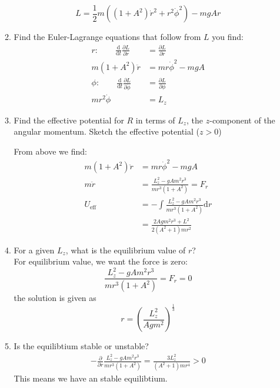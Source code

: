 \documentclass{article}
\newcommand{\de}{\mathrm{d}}
\begin{document}
\begin{enumerate}
\begin{enumerate}
        \[
            L = \frac{1}{2}m((1+A^2)\dot r^2 + r^2 \dot \phi^2) - mgAr
        \]
        \item Find the Euler-Lagrange equations that follow from $L$ you find:
        \begin{align*}
            r: \qquad \frac{\de}{\de t}\frac{\partial L}{\partial \dot r} &= \frac{\partial L}{\partial r}\\
                          m(1+A^2)\ddot r &= mr\dot \phi^2 - mgA \\
                \phi: \qquad \frac{\de}{\de t}\frac{\partial L}{\partial \dot \phi} &= \frac{\partial L}{\partial \phi}\\
                mr^2\dot \phi &= L_z
        \end{align*}
        \item Find the effective potential for $R$ in terms of $L_z$, the $z$-component of the angular momentum. Sketch the effective potential ($z>0$)

        From above we find:
        \begin{align*}
            m(1+A^2)\ddot r &= mr\dot \phi^2 - mgA \\
            m\ddot r &= \frac{L_z^2 - gAm^2r^3}{mr^3(1+A^2)} = F_r\\
            U_\text{eff} &= -\int \frac{L_z^2 - gAm^2r^3}{mr^3(1+A^2)} \de r \\
                         &= \frac{2Agm^2r^3 + L^2}{2(A^2+1)mr^2}
        \end{align*}

        \item For a given $L_z$, what is the equilibrium value of $r$?\\

            For equilibrium value, we want the force is zero:
            \[
            \frac{L_z^2 - gAm^2r^3}{mr^3(1+A^2)} = F_r = 0
            \]
            the solution is given as
            \[
            r= (\frac{L_z^2}{Agm^2})^{\frac{1}{3}}
            \]

        \item Is the equilibtium stable or unstable?\\

        \begin{align*}
            -\frac{\partial}{\partial r} \frac{L_z^2 - gAm^2r^3}{mr^3(1+A^2)} = \frac{3L_z^2}{(A^2 + 1)mr^4} > 0
        \end{align*}
        This means we have an stable equilibtium.



\end{enumerate}
\end{enumerate}
\end{document}
